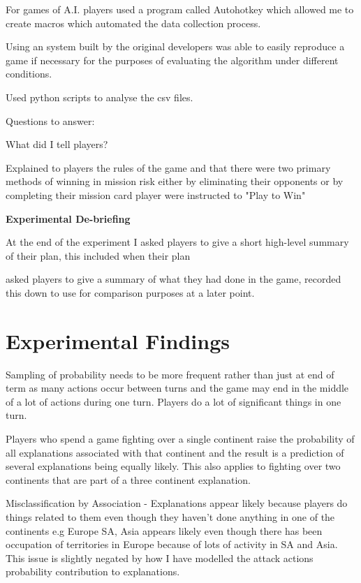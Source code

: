 \documentclass[parskip]{cs4rep}
\begin{document}
For games of A.I. players used a program called Autohotkey which allowed me to create macros which automated the data collection process.

Using an system built by the original developers was able to easily reproduce a game if necessary for the purposes of evaluating the algorithm under different conditions.

Used python scripts to analyse the csv files.

Questions to answer:

What did I tell players?

Explained to players the rules of the game and that there were two primary methods of winning in mission risk either by eliminating their opponents or by completing their mission card player were instructed to "Play to Win"

\textbf{Experimental De-briefing}

At the end of the experiment I asked players to give a short high-level summary of their plan, this included when their plan

asked players to give a summary of what they had done in the game, recorded this down to use for comparison purposes at a later point.

\section{Experimental Findings}

Sampling of probability needs to be more frequent rather than just at end of term as many actions occur between turns and the game may end in the middle of a lot of actions during one turn. Players do a lot of significant things in one turn.

Players who spend a game fighting over a single continent raise the probability of all explanations associated with that continent and the result is a prediction of several explanations being equally likely. This also applies to fighting over two continents that are part of a three continent explanation.

Misclassification by Association - Explanations appear likely because players do things related to them even though they haven't done anything in one of the continents e.g Europe SA, Asia appears likely even though there has been occupation of territories in Europe because of lots of activity in SA and Asia. This issue is slightly negated by how I have modelled the attack actions probability contribution to explanations.
\end{document}
